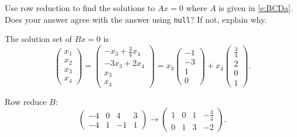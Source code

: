 \documentclass{ximera}
\begin{document}
\begin{computerExercise} \label{c5.3.3}
Use row reduction to find the solutions to $Ax=0$ where $A$ is
given in \eqref{e:BCDa}.  Does your answer agree with the \Matlab
answer using {\tt null}?  If not, explain why.

\begin{solution}

\ans The solution set of $Bx = 0$ is
\[
\left(\begin{array}{r} x_1 \\ x_2 \\ x_3 \\ x_4 \end{array}\right)
= \left(\begin{array}{c} -x_3 + \frac{3}{4}x_4 \\ -3x_3 + 2x_4 \\
x_3 \\ x_4 \end{array}\right) = x_3\left(\begin{array}{r} -1 \\ -3 \\
1 \\ 0 \end{array}\right) + x_4\left(\begin{array}{r} \frac{3}{4} \\
2 \\ 0 \\ 1 \end{array}\right).
\]

\soln Row reduce $B$:
\[
\left(\begin{array}{rrrr} -4 & 0 & 4 & 3 \\ -4 & 1 & -1 & 1
\end{array}\right) \longrightarrow \left(\begin{array}{rrrr}
1 & 0 & 1 & -\frac{3}{4} \\ 0 & 1 & 3 & -2 \end{array}\right).
\]


\end{solution}
\end{computerExercise}
\end{document}
